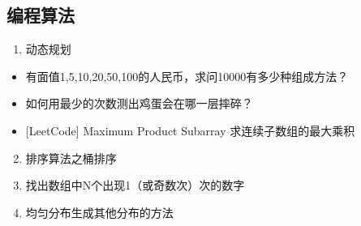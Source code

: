 \documentclass[letterpaper,10pt,english]{sphinxmanual}
\begin{document}
\subsection{编程算法}
\label{\detokenize{else/01_interview:id3}}\begin{enumerate}
\item {} 
动态规划

\end{enumerate}
\begin{itemize}
\item {} 
有面值1,5,10,20,50,100的人民币，求问10000有多少种组成方法？
\begin{quote}

\end{quote}

\item {} 
如何用最少的次数测出鸡蛋会在哪一层摔碎？
\begin{quote}

\end{quote}

\item {} 
{[}LeetCode{]} Maximum Product Subarray 求连续子数组的最大乘积
\begin{quote}

\end{quote}

\end{itemize}
\begin{enumerate}
\setcounter{enumi}{1}
\item {} 
排序算法之桶排序

\end{enumerate}
\begin{quote}

\end{quote}
\begin{enumerate}
\setcounter{enumi}{2}
\item {} 
找出数组中N个出现1（或奇数次）次的数字

\end{enumerate}
\begin{quote}

\end{quote}
\begin{enumerate}
\setcounter{enumi}{3}
\item {} 
均匀分布生成其他分布的方法

\end{enumerate}
\end{document}
